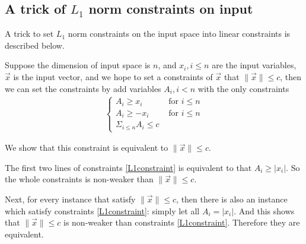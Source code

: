 \subsection*{A trick of $L_1$ norm constraints on input}

A trick to set $L_1$ norm constraints on the input space into linear constraints is described below.

Suppose the dimension of input space is $n$, and $x_i,i\leq n$ are the input variables, $\vec{x}$ is the input vector, and we hope to set a constraints of $\vec{x}$ that $\|\vec{x}\| \leq c$,  then we can set the constraints by add variables $A_i,i<n$ with the only constraints \begin{align}\label{L1constraint}\begin{cases}
	A_i \geq x_i &\text{ for }i \leq n\\ 
	A_i\geq -x_i &\text{ for }i \leq n\\
	\Sigma_{i\leq n} A_i \leq c	&\end{cases}
\end{align}

We show that this constraint is equivalent to $\|\vec{x}\| \leq c$.

The first two lines of constraints \ref{L1constraint} is equivalent to that $A_i\geq |x_i|$. So the whole constraints is non-weaker than $\|\vec{x}\| \leq c$.

Next, for every instance that satisfy $\|\vec{x}\| \leq c$, then there is also an instance which satisfy constraints \ref{L1constraint}: simply let all $A_i = |x_i|$. And this shows that $\|\vec{x}\| \leq c$ is non-weaker than constraints \ref{L1constraint}. Therefore they are equivalent.
